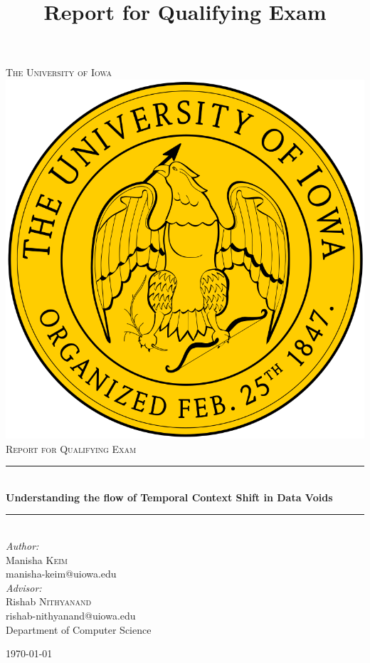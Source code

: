 \documentclass[12pt]{article}
\begin{document}
\begin{titlepage}

\newcommand{\HRule}{\rule{\linewidth}{0.5mm}}
\center


\textsc{\LARGE The University of Iowa}\\[1.5cm]
\includegraphics[scale=.1]{figures/iowa}\\[1cm]
\textsc{\Large Report for Qualifying Exam}\\[0.5cm]
\title {Report for Qualifying Exam}
\HRule \\[0.4cm]
{ \huge \bfseries Understanding the flow of Temporal Context Shift in Data Voids}\\[0.4cm]
\HRule \\[1.5cm]


\emph{Author:} \\
Manisha \textsc{Keim} \\
manisha-keim@uiowa.edu \\[0.5cm]

\emph{Advisor:}\\
Rishab \textsc{Nithyanand}\\
rishab-nithyanand@uiowa.edu \\[0.5cm]

Department of Computer Science



{\today}\\[2cm]

\end{titlepage}
\end{document}
